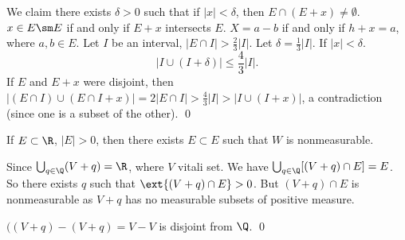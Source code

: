 \pf We claim there exists $\delta>0$ such that if $|x|<\delta$, then $E \cap (E+x) \neq \emptyset$. $x \in E \sm E$ if and only if $E+x$ intersects $E$. $X= a-b$ if and only if $h+x=a$, where $a,b \in E$. Let $I$ be an interval, $|E \cap I|> \frac{2}{3} |I|$. Let $\delta= \frac{1}{3} |I|$. If $|x|<\delta$.
	\[
	|I \cup (I+\delta)| \leq \frac{4}{3} |I|. 
	\]
If $E$ and $E+x$ were disjoint, then $| (E \cap I) \cup (E \cap I +x)|= 2|E \cap I|> \frac{4}{3} |I|> |I \cup (I+x)|$, a contradiction (since one is a subset of the other). \qed \\



\begin{thm}
If $E \subset \R$, $|E|>0$, then there exists $E \subset E$ such that $W$ is nonmeasurable. 
\end{thm}

\pf Since $\bigcup_{q \in \Q} (V+q)=\R$, where $V$ vitali set. We have $\bigcup_{q \in \Q} [(V+q) \cap E]=E$. So there exists $q$ such that $\ext{(V+q) \cap E} >0$. But $(V+q) \cap E$ is nonmeasurable as $V+q$ has no measurable subsets of positive measure. 

$((V+q)-(V+q)= V-V$ is disjoint from $\Q$. \qed \\
































